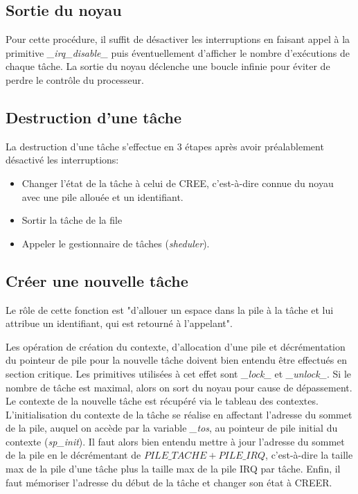 \subsection{Sortie du noyau}
Pour cette procédure, il suffit de désactiver les interruptions en faisant appel à la primitive \textit{\_irq\_disable\_} puis éventuellement d'afficher le nombre d'exécutions de chaque tâche. La sortie du noyau déclenche une boucle infinie pour éviter de perdre le contrôle du processeur.
%

\subsection{Destruction d'une tâche}
La destruction d'une tâche s'effectue en 3 étapes après avoir préalablement désactivé les interruptions:
\begin{itemize}
    \item Changer l'état de la tâche à celui de CREE, c'est-à-dire connue du noyau avec une pile allouée et un identifiant.
    \item Sortir la tâche de la file
    \item Appeler le gestionnaire de tâches (\textit{sheduler}).
\end{itemize}
%

\subsection{Créer une nouvelle tâche}
Le rôle de cette fonction est "d'allouer un espace dans la pile à la tâche et lui attribue un identifiant, qui est retourné à l’appelant".

Les opération de création du contexte, d'allocation d'une pile et décrémentation du pointeur de pile pour la nouvelle tâche doivent bien entendu être effectués en section critique. Les primitives utilisées à cet effet sont \textit{\_lock\_} et \textit{\_unlock\_}. Si le nombre de tâche est maximal, alors on sort du noyau pour cause de dépassement. Le contexte de la nouvelle tâche est récupéré via le tableau des contextes. L'initialisation du contexte de la tâche se réalise en affectant l'adresse du sommet de la pile, auquel on accède par la variable \textit{\_tos}, au pointeur de pile initial du contexte (\textit{sp\_init}). Il faut alors bien entendu mettre à jour l'adresse du sommet de la pile en le décrémentant de $PILE\_TACHE + PILE\_IRQ$, c'est-à-dire la taille max de la pile d'une tâche plus la taille max de la pile IRQ par tâche.
Enfin, il faut mémoriser l'adresse du début de la tâche et changer son état à CREER.
%

